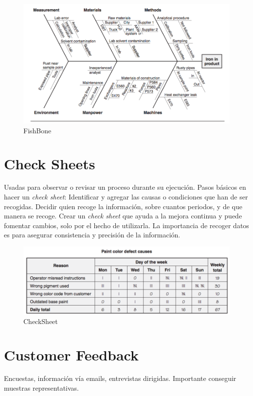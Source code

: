 \documentclass[oneside]{book}
\begin{document}
\begin{figure}[H]
	\centering
	\includegraphics[width=120mm]{imagenes/FishBone.png}
	\caption{FishBone}
	\label{fig:FishBone}
\end{figure}

\section{Check Sheets}

Usadas para observar o revisar un proceso durante su ejecución. Pasos básicos en hacer un \textit{check sheet}: Identificar y agregar las causas o condiciones que han de ser recogidas. Decidir quien recoge la información, sobre cuantos periodos, y de que manera se recoge. Crear un \textit{check sheet} que ayuda a la mejora continua y puede fomentar cambios, solo por el hecho de utilizarla. La importancia de recoger datos es para asegurar consistencia y precisión de la información.

\begin{figure}[H]
	\centering
	\includegraphics[width=120mm]{imagenes/CheckSheet.png}
	\caption{CheckSheet}
	\label{fig:CheckSheet}
\end{figure}

\section{Customer Feedback}

Encuestas, información vía emails, entrevistas dirigidas. Importante conseguir muestras representativas.
\end{document}
